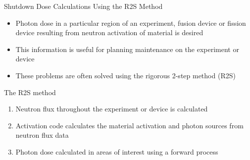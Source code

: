 \documentclass{beamer}
\begin{document}
\begin{frame}{Shutdown Dose Calculations Using the R2S Method}

  \begin{itemize}
    \item Photon dose in a particular region of an experiment, fusion
      device or fission device resulting from neutron activation of material
      is desired
      \medskip
    \item This information is useful for planning maintenance on the experiment
      or device
      \medskip
    \item These problems are often solved using the rigorous 2-step method (R2S)
  \end{itemize}

  \medskip
  \medskip

  \begin{beamerboxesrounded}[upper=boxheadcolor,lower=boxbodycolor,shadow=true]{The R2S method}
    \begin{enumerate}
      \item Neutron flux throughout the experiment or device is calculated
        \smallskip
      \item Activation code calculates the material activation and photon
        sources from neutron flux data
        \smallskip
      \item Photon dose calculated in areas of interest using a forward
        process
    \end{enumerate}
  \end{beamerboxesrounded}

\end{frame}
\end{document}
